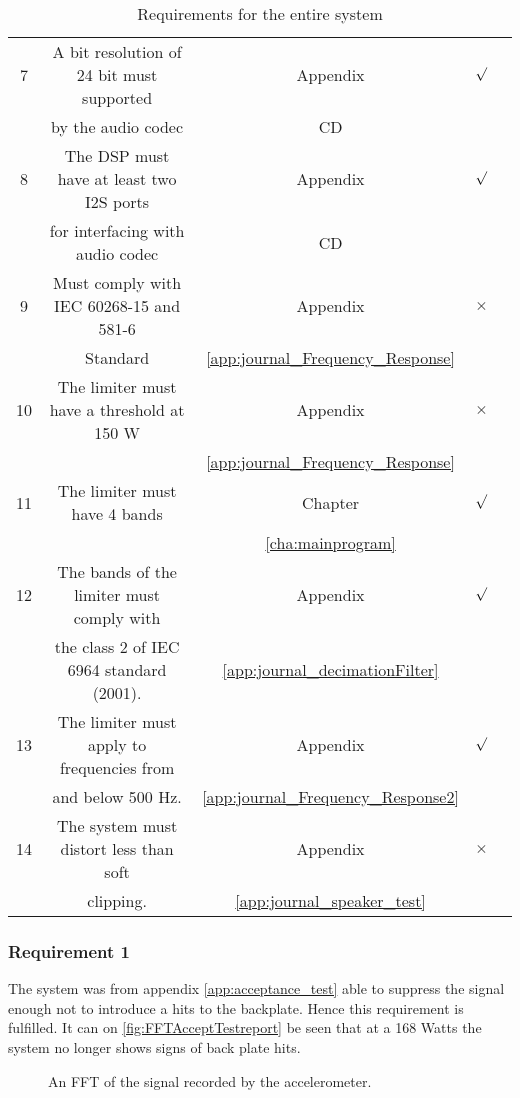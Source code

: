 \begin{table}[H]
\begin{tabular}{|c|c|c|c|c|}
7			&  A bit resolution of 24 bit must supported 	& Appendix								&	$\surd$			\\ 
			&  by the audio codec			 	 	 		&	CD					 				&					\\ \hline
%
8			& The DSP must have at least two I2S ports 		& Appendix								&	$\surd$			\\ 
			& for interfacing with audio codec  			& 	CD		 					 		&					\\ \hline
%
9			& Must comply with IEC 60268-15 and 581-6		& Appendix								&	$\times$		\\ 
			& Standard								  	 	& \ref{app:journal_Frequency_Response}	&					\\ \hline
%
10			& The limiter must have a threshold at 150 W 	& Appendix								&	$\times$		\\ 
			& 										        & \ref{app:journal_Frequency_Response}	&					\\ \hline

11			& The limiter must have 4 bands 				& Chapter								&	$\surd$			\\ 
			& 												& \ref{cha:mainprogram}			 		&					\\ \hline

12			& The bands of the limiter  must comply with 	& Appendix								&	$\surd$			\\ 
			& the class 2 of IEC 6964 standard (2001).		& \ref{app:journal_decimationFilter}	&					\\ \hline
%
13			& The limiter must apply to frequencies from	& Appendix								&	$\surd$			\\ 
			& and below 500 Hz. 						 	& \ref{app:journal_Frequency_Response2}	&					\\ \hline
%
14			& The system must distort less than soft  		& Appendix								&	$\times$		\\ 
			& clipping.										& \ref{app:journal_speaker_test}	 	&					\\ \hline								
\end{tabular}	
\caption{Requirements for the entire system}
\label{table:acceptancetest}
\end{table}

\subsubsection*{Requirement 1}

The system was from appendix \ref{app:acceptance_test} able to suppress the signal enough not to introduce a hits to the backplate. Hence this requirement is fulfilled. It can on \autoref{fig:FFTAcceptTestreport} be seen that at a 168 Watts the system no longer shows signs of back plate hits.
\begin{figure}[H]
	\centering
	
	\caption{An FFT of the signal recorded by the accelerometer.}
	\label{fig:FFTAcceptTestreport}
\end{figure}

